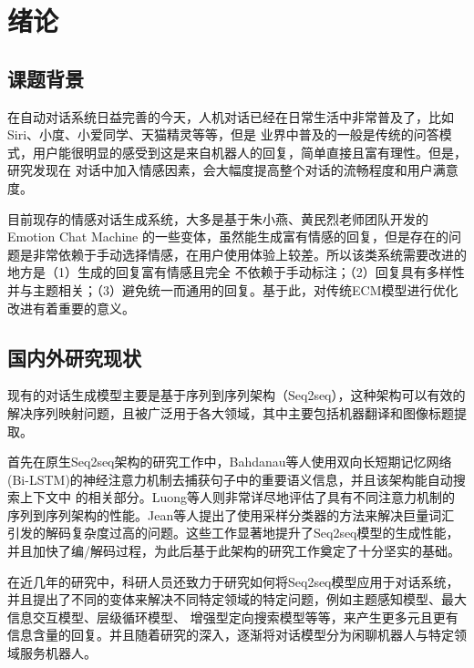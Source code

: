 \documentclass[supercite]{HustGraduPaper}
\theoremstyle{definition}
\begin{document}
\tableofcontents[level=2]
\clearpage


\section{绪论}

\subsection{课题背景}
在自动对话系统日益完善的今天，人机对话已经在日常生活中非常普及了，比如Siri、小度、小爱同学、天猫精灵等等，但是
业界中普及的一般是传统的问答模式，用户能很明显的感受到这是来自机器人的回复，简单直接且富有理性。但是，研究发现在
对话中加入情感因素，会大幅度提高整个对话的流畅程度和用户满意度。

目前现存的情感对话生成系统，大多是基于朱小燕、黄民烈老师团队开发的Emotion Chat Machine\cite{DBLP:journals/corr/ZhouHZZL17}
的一些变体，虽然能生成富有情感的回复，但是存在的问题是非常依赖于手动选择情感，在用户使用体验上较差。所以该类系统需要改进的地方是（1）生成的回复富有情感且完全
不依赖于手动标注；（2）回复具有多样性并与主题相关；（3）避免统一而通用的回复。基于此，对传统ECM模型进行优化改进有着重要的意义。

\subsection{国内外研究现状}

现有的对话生成模型主要是基于序列到序列架构（Seq2seq），这种架构可以有效的解决序列映射问题，且被广泛用于各大领域，其中主要包括机器翻译和图像标题提取。

首先在原生Seq2seq架构的研究工作中，Bahdanau\cite{bahdanau2014neural}等人使用双向长短期记忆网络(Bi-LSTM)的神经注意力机制去捕获句子中的重要语义信息，并且该架构能自动搜索上下文中
的相关部分。Luong\cite{luong2015effective}等人则非常详尽地评估了具有不同注意力机制的序列到序列架构的性能。Jean\cite{jean2014using}等人提出了使用采样分类器的方法来解决巨量词汇
引发的解码复杂度过高的问题。这些工作显著地提升了Seq2seq模型的生成性能，并且加快了编/解码过程，为此后基于此架构的研究工作奠定了十分坚实的基础。

在近几年的研究中，科研人员还致力于研究如何将Seq2seq模型应用于对话系统，并且提出了不同的变体来解决不同特定领域的特定问题，例如主题感知模型、最大信息交互模型、层级循环模型、
增强型定向搜索模型等等，来产生更多元且更有信息含量的回复。并且随着研究的深入，逐渐将对话模型分为闲聊机器人与特定领域服务机器人。
\end{document}
